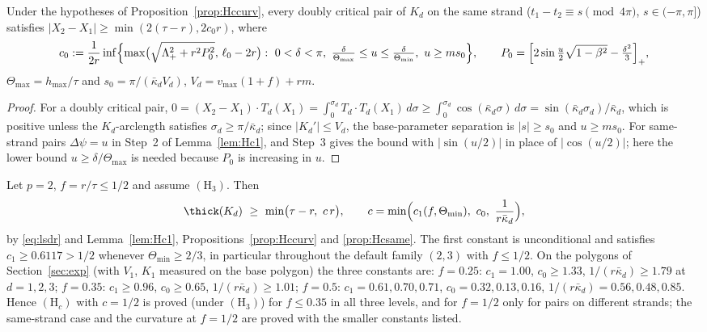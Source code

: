 \begin{proposition}[same strand, $p=2$]\label{prop:Hcsame}
Under the hypotheses of Proposition~\ref{prop:Hccurv}, every doubly critical pair of $K_d$ on the same strand
($t_1-t_2\equiv s\pmod{4\pi}$, $s\in(-\pi,\pi]$) satisfies $|X_2-X_1|\ge\min(2(\tau-r),2c_0r)$, where
\[
c_0:=\frac1{2r}\inf\Bigl\{\max\bigl(\sqrt{\Lambda_+^2+r^2P_0^2},\,\ell_0-2r\bigr):\ 0<\delta<\pi,\
\tfrac{\delta}{\Theta_{\max}}\le u\le\tfrac{\delta}{\Theta_{\min}},\ u\ge ms_0\Bigr\},\qquad
P_0=\Bigl[2\sin\tfrac u2\sqrt{1-\beta^2}-\tfrac{\delta^2}3\Bigr]_+,
\]
$\Theta_{\max}=h_{\max}/\tau$ and $s_0=\pi/(\bar\kappa_dV_d)$, $V_d=v_{\max}(1+f)+rm$.
\end{proposition}
\begin{proof}
For a doubly critical pair, $0=(X_2-X_1)\cdot T_d(X_1)=\int_0^{\sigma_d}T_d\cdot T_d(X_1)\,d\sigma
\ge\int_0^{\sigma_d}\cos(\bar\kappa_d\sigma)\,d\sigma=\sin(\bar\kappa_d\sigma_d)/\bar\kappa_d$, which is positive
unless the $K_d$-arclength satisfies $\sigma_d\ge\pi/\bar\kappa_d$; since $|K_d'|\le V_d$, the base-parameter
separation is $|s|\ge s_0$ and $u\ge ms_0$. For same-strand pairs $\Delta\psi=u$ in Step~2 of Lemma~\ref{lem:Hc1},
and Step~3 gives the bound with $|\sin(u/2)|$ in place of $|\cos(u/2)|$; here the lower bound $u\ge\delta/\Theta_{\max}$
is needed because $P_0$ is increasing in $u$.
\end{proof}

\begin{theorem}[what is proved of $(\mathrm H_c)$ for $p=2$]\label{thm:Hc}
Let $p=2$, $f=r/\tau\le1/2$ and assume $(\mathrm H_3)$. Then
\[
\thick(K_d)\ \ge\ \min\bigl(\tau-r,\ c\,r\bigr),\qquad c=\min\Bigl(c_1(f,\Theta_{\min}),\ c_0,\ \frac1{r\bar\kappa_d}\Bigr),
\]
by \eqref{eq:lsdr} and Lemma~\ref{lem:Hc1}, Propositions~\ref{prop:Hccurv} and \ref{prop:Hcsame}. The first constant
is unconditional and satisfies $c_1\ge0.6117>1/2$ whenever $\Theta_{\min}\ge2/3$, in particular throughout the default
family $(2,3)$ with $f\le1/2$. On the polygons of Section~\ref{sec:exp} (with $V_1$, $K_1$ measured on the base
polygon) the three constants are: $f=0.25$: $c_1=1.00$, $c_0\ge1.33$, $1/(r\bar\kappa_d)\ge1.79$ at $d=1,2,3$;
$f=0.35$: $c_1\ge0.96$, $c_0\ge0.65$, $1/(r\bar\kappa_d)\ge1.01$; $f=0.5$: $c_1=0.61,0.70,0.71$,
$c_0=0.32,0.13,0.16$, $1/(r\bar\kappa_d)=0.56,0.48,0.85$. Hence $(\mathrm H_c)$ with $c=1/2$ is proved (under
$(\mathrm H_3)$) for $f\le0.35$ in all three levels, and for $f=1/2$ only for pairs on different strands; the
same-strand case and the curvature at $f=1/2$ are proved with the smaller constants listed.
\end{theorem}

